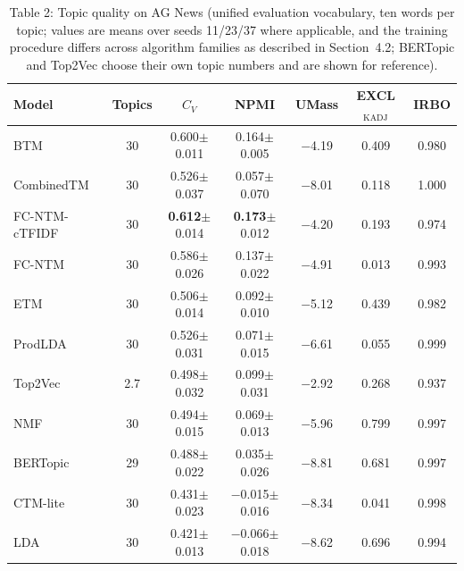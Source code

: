 \documentclass{article}
\begin{document}
\begin{table}[t]
\centering
\caption{Table 2: Topic quality on AG News (unified evaluation vocabulary, ten words per topic; values are means over seeds 11/23/37 where applicable, and the training procedure differs across algorithm families as described in Section~4.2; BERTopic and Top2Vec choose their own topic numbers and are shown for reference).}
\label{tab:agnews}
\small
\begin{tabular}{lcccccc}
\toprule
Model & Topics & $C_V$ & NPMI & UMass & EXCL$_{\mathrm{KADJ}}$ & IRBO \\
\midrule
BTM & 30 & 0.600$\pm$0.011 & 0.164$\pm$0.005 & $-$4.19 & 0.409 & 0.980 \\
CombinedTM & 30 & 0.526$\pm$0.037 & 0.057$\pm$0.070 & $-$8.01 & 0.118 & 1.000 \\
FC-NTM-cTFIDF & 30 & \textbf{0.612}$\pm$0.014 & \textbf{0.173}$\pm$0.012 & $-$4.20 & 0.193 & 0.974 \\
FC-NTM & 30 & 0.586$\pm$0.026 & 0.137$\pm$0.022 & $-$4.91 & 0.013 & 0.993 \\
ETM & 30 & 0.506$\pm$0.014 & 0.092$\pm$0.010 & $-$5.12 & 0.439 & 0.982 \\
ProdLDA & 30 & 0.526$\pm$0.031 & 0.071$\pm$0.015 & $-$6.61 & 0.055 & 0.999 \\
Top2Vec & 2.7 & 0.498$\pm$0.032 & 0.099$\pm$0.031 & $-$2.92 & 0.268 & 0.937 \\
NMF & 30 & 0.494$\pm$0.015 & 0.069$\pm$0.013 & $-$5.96 & 0.799 & 0.997 \\
BERTopic & 29 & 0.488$\pm$0.022 & 0.035$\pm$0.026 & $-$8.81 & 0.681 & 0.997 \\
CTM-lite & 30 & 0.431$\pm$0.023 & $-$0.015$\pm$0.016 & $-$8.34 & 0.041 & 0.998 \\
LDA & 30 & 0.421$\pm$0.013 & $-$0.066$\pm$0.018 & $-$8.62 & 0.696 & 0.994 \\
\bottomrule
\end{tabular}
\end{table}
\end{document}
